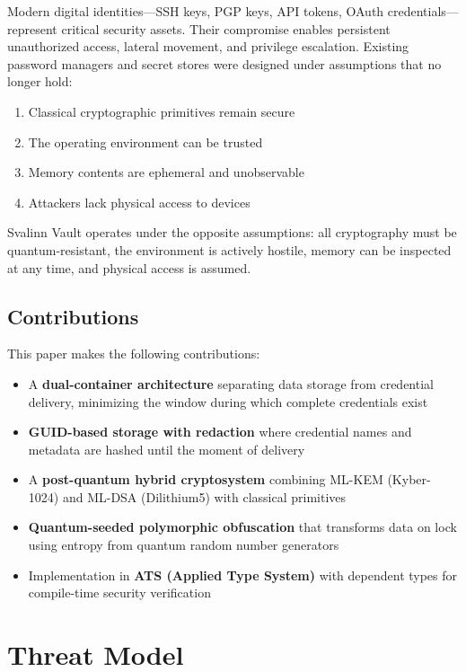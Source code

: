 \documentclass[11pt,a4paper]{article}
\begin{document}
Modern digital identities---SSH keys, PGP keys, API tokens, OAuth credentials---represent critical security assets. Their compromise enables persistent unauthorized access, lateral movement, and privilege escalation. Existing password managers and secret stores were designed under assumptions that no longer hold:

\begin{enumerate}
    \item Classical cryptographic primitives remain secure
    \item The operating environment can be trusted
    \item Memory contents are ephemeral and unobservable
    \item Attackers lack physical access to devices
\end{enumerate}

Svalinn Vault operates under the opposite assumptions: all cryptography must be quantum-resistant, the environment is actively hostile, memory can be inspected at any time, and physical access is assumed.

\subsection{Contributions}

This paper makes the following contributions:

\begin{itemize}
    \item A \textbf{dual-container architecture} separating data storage from credential delivery, minimizing the window during which complete credentials exist
    \item \textbf{GUID-based storage with redaction} where credential names and metadata are hashed until the moment of delivery
    \item A \textbf{post-quantum hybrid cryptosystem} combining ML-KEM (Kyber-1024) and ML-DSA (Dilithium5) with classical primitives
    \item \textbf{Quantum-seeded polymorphic obfuscation} that transforms data on lock using entropy from quantum random number generators
    \item Implementation in \textbf{ATS (Applied Type System)} with dependent types for compile-time security verification
\end{itemize}

\section{Threat Model}
\end{document}
